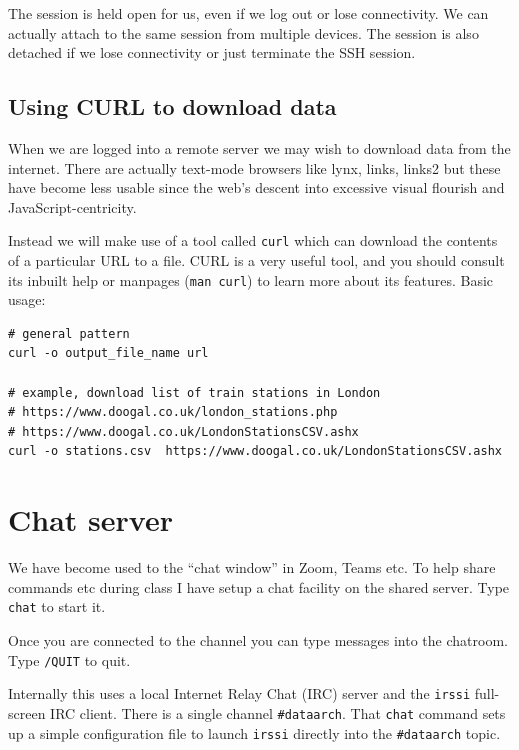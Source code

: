 \documentclass{pgnotes}
\begin{document}
The session is held open for us, even if we log out or lose connectivity.
We can actually attach to the same session from multiple devices.
The session is also detached if we lose connectivity or just terminate the SSH session.

\subsection{Using CURL to download data}
\label{using-curl-to-download-data}

When we are logged into a remote server we may wish to download data
from the internet. There are actually text-mode browsers like lynx,
links, links2 but these have become less usable since the web's descent
into excessive visual flourish and JavaScript-centricity.

Instead we will make use of a tool called \texttt{curl} which can
download the contents of a particular URL to a file. CURL is a very
useful tool, and you should consult its inbuilt help or manpages
(\texttt{man\ curl}) to learn more about its features. Basic usage:

\begin{verbatim}
# general pattern
curl -o output_file_name url

# example, download list of train stations in London
# https://www.doogal.co.uk/london_stations.php
# https://www.doogal.co.uk/LondonStationsCSV.ashx
curl -o stations.csv  https://www.doogal.co.uk/LondonStationsCSV.ashx
\end{verbatim}

\section{Chat server}

We have become used to the ``chat window'' in Zoom, Teams etc.
To help share commands etc during class I have setup a chat facility on the shared server.
Type \texttt{chat} to start it.

Once you are connected to the channel you can type messages into the chatroom.
Type \texttt{/QUIT} to quit.

Internally this uses a local Internet Relay Chat (IRC) server and the \texttt{irssi} full-screen IRC client.
There is a single channel \texttt{\#dataarch}. 
That \texttt{chat} command sets up a simple configuration file to launch \texttt{irssi} directly into the \texttt{\#dataarch} topic. 
\end{document}
